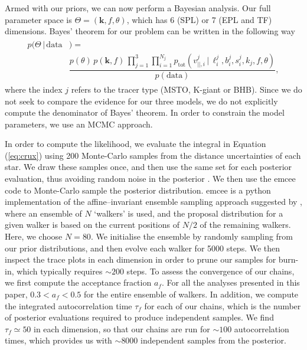 \documentclass[useAMS,twocolumn,usenatbib]{mn2e}
\begin{document}
Armed with our priors, we can now perform a Bayesian analysis. 
Our full parameter space is $\Theta =(\boldsymbol{k},f,\theta)$, which has 6 (SPL) or 7 (EPL and TF) dimensions. 
Bayes' theorem for our problem can be written in the following way
%
\begin{gather}
\begin{align}
p(\Theta \,| \,\mathrm{data}{}&) =  \nonumber \\
                    {}& \dfrac{p(\theta)\,p(\boldsymbol{k},f)\,\prod\limits_{j=1}^3
                    \prod\limits_{i=1}^{N_j}p_\mathrm{tot}(v_{||,i}^j \,|\, \ell_i^j,b_i^j,s_i^j,k_j,f,\theta)}{p(\mathrm{data})},
\end{align}
\label{eq:bayes}
\end{gather}
%
where the index $j$ refers to the tracer type (MSTO, K-giant or BHB). 
Since we do not seek to compare the evidence for our three models, we do not explicitly compute the denominator of Bayes' theorem. 
In order to constrain the model parameters, we use an MCMC approach.

In order to compute the likelihood, we evaluate the integral in Equation (\ref{eq:crux}) using 200 Monte-Carlo samples from the distance uncertainties of each star. 
We draw these samples once, and then use the same set for each posterior evaluation, thus avoiding random noise in the posterior \citep{Mc13}.
We then use the {\sc emcee} code \citep{emcee} to Monte-Carlo sample the posterior distribution. 
{\sc emcee} is a {\sc python} implementation of the affine--invariant ensemble sampling approach suggested by \citet{Go10}, where an ensemble of $N$ `walkers' is used, and the proposal distribution for a given walker is based on the current positions of $N/2$ of the remaining walkers. 
Here, we choose $N=80$.
We initialise the ensemble by randomly sampling from our prior distributions, and then evolve each walker for 5000 steps. 
We then inspect the trace plots in each dimension in order to prune our samples for burn-in, which typically requires $\sim 200$ steps. 
To assess the convergence of our chains, we first compute the acceptance fraction $a_f$.
For all the analyses presented in this paper, $0.3 < a_f < 0.5$ for the entire ensemble of walkers.
In addition, we compute the integrated autocorrelation time $\tau_f$ for each of our chains, which is the number of posterior evaluations required to produce independent samples.
We find $\tau_f \simeq 50$ in each dimension, so that our chains are run for $\sim 100$ autocorrelation times, which provides us with $\sim 8000$ independent samples from the posterior.
\end{document}
